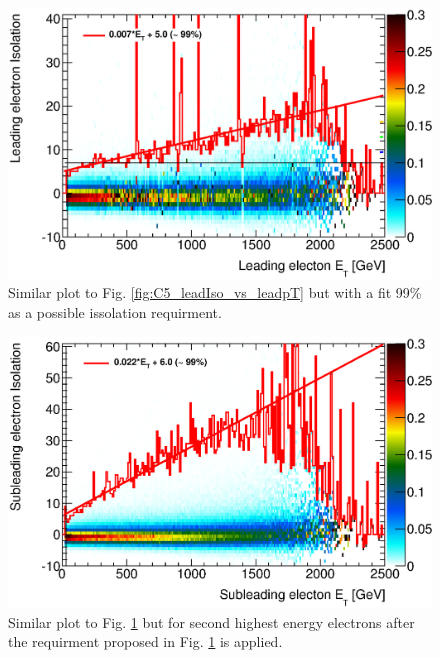    \begin{figure}[h]
      \begin{center}
      \includegraphics[scale=0.7]{images/C5_leadIso_vs_leadpT_proposal.eps}
      \end{center}
   \caption{Similar plot to Fig. \ref{fig:C5_leadIso_vs_leadpT} but with a fit 99\% as a possible issolation requirment.}
   \label{fig:C5_leadIso_vs_leadpT_proposal}
   \end{figure}


   \begin{figure}[h]
      \begin{center}
      \includegraphics[scale=0.7]{images/C5_subIso_vs_subpT_proposal.eps}
      \end{center}
   \caption{Similar plot to Fig. \ref{fig:C5_leadIso_vs_leadpT_proposal} but for second highest energy electrons after the requirment proposed in Fig. \ref{fig:C5_leadIso_vs_leadpT_proposal} is applied.}
   \label{fig:C5_subIso_vs_subpT_proposal}
   \end{figure}




